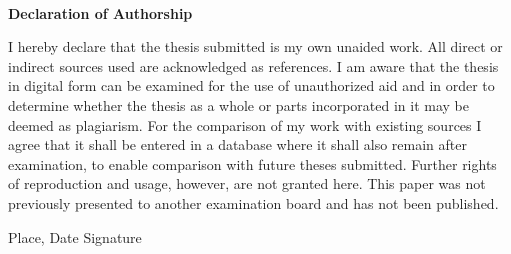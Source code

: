 \ 
\vspace{2cm}

\begin{center}
	\large \textbf{Declaration of Authorship}
\end{center}

\vspace{1cm}
\noindent
I hereby declare that the thesis submitted is my own unaided work. All direct or indirect sources used are acknowledged as references. I am aware that the thesis in digital form can be examined for the use of unauthorized aid and in order to determine whether the thesis as a whole or parts incorporated in it may be deemed as plagiarism. For the comparison of my work with existing sources I agree that it shall be entered in a database where it shall also remain after examination, to enable comparison with future theses submitted. Further rights of reproduction and usage, however, are not granted here. This paper was not previously presented to another examination board and has not been published.

\vspace{2cm}

\noindent\hspace{1.5cm} Place, Date \hfill Signature \hspace{1.5cm}